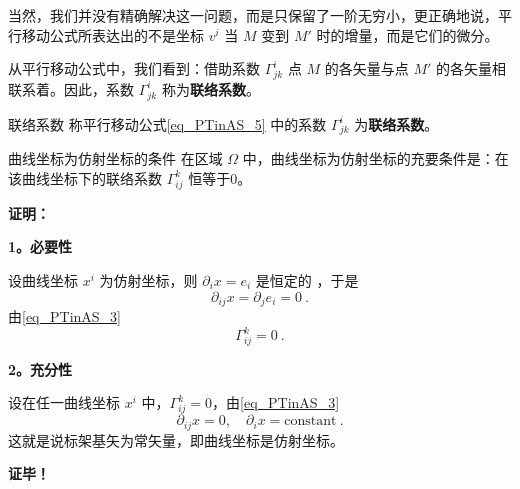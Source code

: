 当然，我们并没有精确解决这一问题，而是只保留了一阶无穷小，更正确地说，平行移动公式所表达出的不是坐标 $v^i$ 当 $M$ 变到 $M'$ 时的增量，而是它们的微分。

从平行移动公式中，我们看到：借助系数 $\Gamma^i_{jk}$ 点 $M$ 的各矢量与点 $M'$ 的各矢量相联系着。因此，系数 $\Gamma^i_{jk}$ 称为\textbf{联络系数}。
\begin{definition}{联络系数}
称平行移动公式\autoref{eq_PTinAS_5} 中的系数 $\Gamma^i_{jk}$ 为\textbf{联络系数}。
\end{definition}
\begin{theorem}{曲线坐标为仿射坐标的条件}
在区域 $\Omega$ 中，曲线坐标为仿射坐标的充要条件是：在该曲线坐标下的联络系数 $\Gamma^k_{ij}$ 恒等于0。
\end{theorem}
\textbf{证明：}

\textbf{1。必要性}

设曲线坐标 $x^i$ 为仿射坐标，则 $\partial_i x=e_i$ 是恒定的 ，于是
\begin{equation}
\partial_{ij} x=\partial_j e_i=0~.
\end{equation}
由\autoref{eq_PTinAS_3} 
\begin{equation}
\Gamma^k_{ij}=0~.
\end{equation}

\textbf{2。充分性}

设在任一曲线坐标 $x^i$ 中，$\Gamma^k_{ij}=0$，由\autoref{eq_PTinAS_3} 
\begin{equation}
\partial_{ij}x=0,\quad \partial_i x=\mathrm{constant}~.
\end{equation}
这就是说标架基矢为常矢量，即曲线坐标是仿射坐标。

\textbf{证毕！}